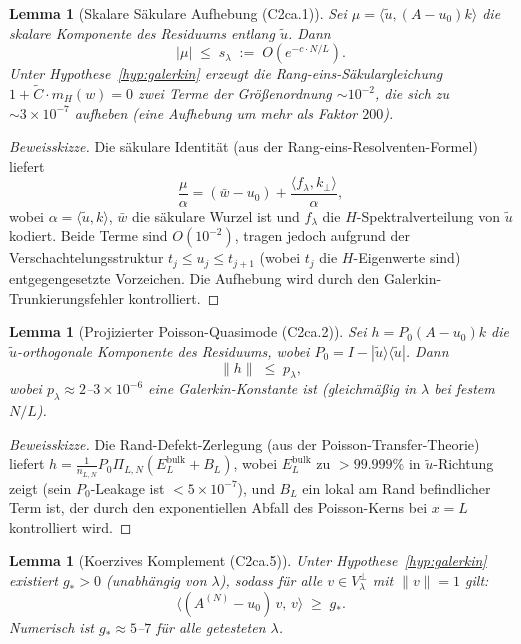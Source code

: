 \documentclass[11pt,a4paper]{article}
\theoremstyle{plain}
\newtheorem{lemma}[theorem]{Lemma}
\theoremstyle{definition}
\begin{document}
\begin{lemma}[Skalare Säkulare Aufhebung (C2ca.1)]
\label{lem:secular}
Sei $\mu = \langle \tilde{u}, (A-u_0)k\rangle$ die skalare
Komponente des Residuums entlang $\tilde{u}$. Dann
\[
  |\mu| \;\leq\; s_\lambda \;:=\; O(e^{-c \cdot N/L}).
\]
Unter Hypothese~\ref{hyp:galerkin} erzeugt die Rang-eins-Säkulargleichung
$1 + \tilde{C} \cdot m_H(w) = 0$ zwei Terme der Größenordnung $\sim 10^{-2}$, die sich zu
$\sim 3 \times 10^{-7}$ aufheben (eine Aufhebung um mehr als Faktor $200$).
\end{lemma}

\begin{proof}[Beweisskizze]
Die säkulare Identität (aus der Rang-eins-Resolventen-Formel) liefert
\[
  \frac{\mu}{\alpha} = (\bar{w} - u_0)
    + \frac{\langle f_\lambda, k_\perp\rangle}{\alpha},
\]
wobei $\alpha = \langle\tilde{u},k\rangle$, $\bar{w}$ die säkulare
Wurzel ist und $f_\lambda$ die $H$-Spektralverteilung von
$\tilde{u}$ kodiert. Beide Terme sind $O(10^{-2})$, tragen jedoch
aufgrund der Verschachtelungsstruktur $t_j \leq u_j \leq t_{j+1}$
(wobei $t_j$ die $H$-Eigenwerte sind) entgegengesetzte Vorzeichen. Die
Aufhebung wird durch den Galerkin-Trunkierungsfehler kontrolliert.
\end{proof}

\begin{lemma}[Projizierter Poisson-Quasimode (C2ca.2)]
\label{lem:projected}
Sei $h = P_0(A-u_0)k$ die $\tilde{u}$-orthogonale Komponente
des Residuums, wobei $P_0 = I - |\tilde{u}\rangle\langle\tilde{u}|$.
Dann
\[
  \|h\| \;\leq\; p_\lambda,
\]
wobei $p_\lambda \approx 2$--$3 \times 10^{-6}$ eine
Galerkin-Konstante ist (gleichmäßig in $\lambda$ bei festem $N/L$).
\end{lemma}

\begin{proof}[Beweisskizze]
Die Rand-Defekt-Zerlegung (aus der Poisson-Transfer-Theorie)
liefert $h = \frac{1}{n_{L,N}} P_0 \Pi_{L,N}(E_L^{\mathrm{bulk}} + B_L)$,
wobei $E_L^{\mathrm{bulk}}$ zu $> 99.999\%$ in $\tilde{u}$-Richtung zeigt
(sein $P_0$-Leakage ist $< 5 \times 10^{-7}$), und $B_L$ ein lokal am Rand
befindlicher Term ist, der durch den exponentiellen Abfall des
Poisson-Kerns bei $x = L$ kontrolliert wird.
\end{proof}

\begin{lemma}[Koerzives Komplement (C2ca.5)]
\label{lem:coercive}
Unter Hypothese~\ref{hyp:galerkin} existiert $g_* > 0$
(unabhängig von $\lambda$), sodass für alle
$v \in V_\lambda^\perp$ mit $\|v\| = 1$ gilt:
\[
  \langle (A^{(N)} - u_0)\, v,\, v\rangle \;\geq\; g_*.
\]
Numerisch ist $g_* \approx 5$--$7$ für alle getesteten $\lambda$.
\end{lemma}
\end{document}
